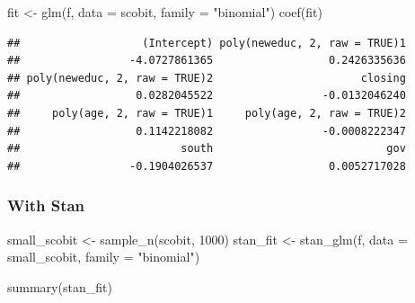 \documentclass[
]{book}
\newenvironment{Shaded}{\begin{snugshade}}{\end{snugshade}}
\newcommand{\AttributeTok}[1]{\textcolor[rgb]{0.77,0.63,0.00}{#1}}
\newcommand{\DecValTok}[1]{\textcolor[rgb]{0.00,0.00,0.81}{#1}}
\newcommand{\FunctionTok}[1]{\textcolor[rgb]{0.00,0.00,0.00}{#1}}
\newcommand{\NormalTok}[1]{#1}
\newcommand{\OtherTok}[1]{\textcolor[rgb]{0.56,0.35,0.01}{#1}}
\newcommand{\StringTok}[1]{\textcolor[rgb]{0.31,0.60,0.02}{#1}}
\begin{document}
\begin{Shaded}
\begin{Highlighting}[]
\NormalTok{fit }\OtherTok{\textless{}{-}} \FunctionTok{glm}\NormalTok{(f, }\AttributeTok{data =}\NormalTok{ scobit, }\AttributeTok{family =} \StringTok{"binomial"}\NormalTok{)}
\FunctionTok{coef}\NormalTok{(fit)}
\end{Highlighting}
\end{Shaded}

\begin{verbatim}
##                   (Intercept) poly(neweduc, 2, raw = TRUE)1 
##                 -4.0727861365                  0.2426335636 
## poly(neweduc, 2, raw = TRUE)2                       closing 
##                  0.0282045522                 -0.0132046240 
##     poly(age, 2, raw = TRUE)1     poly(age, 2, raw = TRUE)2 
##                  0.1142218082                 -0.0008222347 
##                         south                           gov 
##                 -0.1904026537                  0.0052717028
\end{verbatim}

\hypertarget{with-stan}{%
\subsubsection{With Stan}\label{with-stan}}

\begin{Shaded}
\begin{Highlighting}[]
\NormalTok{small\_scobit }\OtherTok{\textless{}{-}} \FunctionTok{sample\_n}\NormalTok{(scobit, }\DecValTok{1000}\NormalTok{)}
\NormalTok{stan\_fit }\OtherTok{\textless{}{-}} \FunctionTok{stan\_glm}\NormalTok{(f, }\AttributeTok{data =}\NormalTok{ small\_scobit, }\AttributeTok{family =} \StringTok{"binomial"}\NormalTok{)}
\end{Highlighting}
\end{Shaded}

\begin{Shaded}
\begin{Highlighting}[]
\FunctionTok{summary}\NormalTok{(stan\_fit)}
\end{Highlighting}
\end{Shaded}
\end{document}
